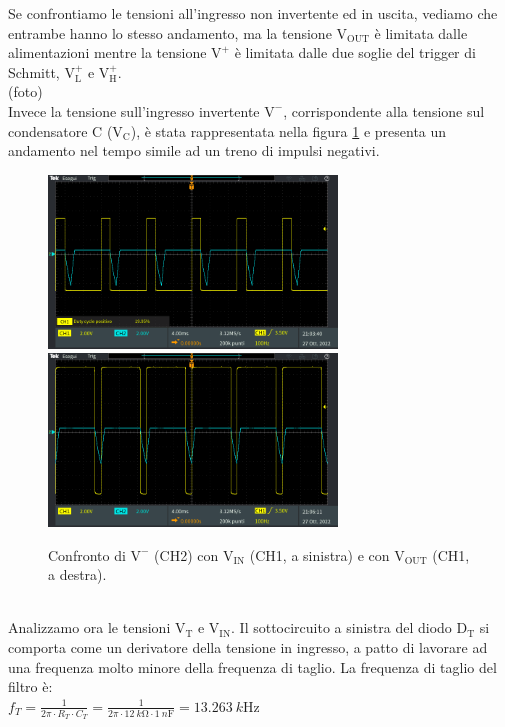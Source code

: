 \documentclass{report}
\begin{document}
Se confrontiamo le tensioni all'ingresso non invertente ed in uscita, vediamo che entrambe hanno lo stesso andamento, ma la tensione $\mathrm{V_{OUT}}$ è limitata dalle alimentazioni mentre la tensione $\mathrm{V^+}$ è limitata dalle due soglie del trigger di Schmitt, $\mathrm{V_L^+}$ e $\mathrm{V_H^+}$.
\\(foto)
\\Invece la tensione sull'ingresso invertente $\mathrm{V^-}$, corrispondente alla tensione sul condensatore C ($\mathrm{V_C}$), è stata rappresentata nella figura \ref{figura:TEK00004e5} e presenta un andamento nel tempo simile ad un treno di impulsi negativi.
\begin{figure}[h!]
	\centering
	\includegraphics[height=4.6cm]{immagini/TEK00004}
	\includegraphics[height=4.6cm]{immagini/TEK00005}
	\caption{Confronto di $\mathrm{V^-}$ (CH2) con $\mathrm{V_{IN}}$ (CH1, a sinistra) e con $\mathrm{V_{OUT}}$ (CH1, a destra).}
	\label{figura:TEK00004e5}
\end{figure}
\\Analizzamo ora le tensioni $\mathrm{V_T}$ e $\mathrm{V_{IN}}$. Il sottocircuito a sinistra del diodo $\mathrm{D_T}$ si comporta come un derivatore della tensione in ingresso, a patto di lavorare ad una frequenza molto minore della frequenza di taglio. La frequenza di taglio del filtro è:
\\[4pt]\indent$\displaystyle{f_T = \frac{1}{2\pi\cdot R_T\cdot C_T} = \frac{1}{2\pi\cdot \SI{12}{k\ohm}\cdot\SI{1}{n\farad}} =\SI{13.263}{k\hertz}}$
\end{document}
